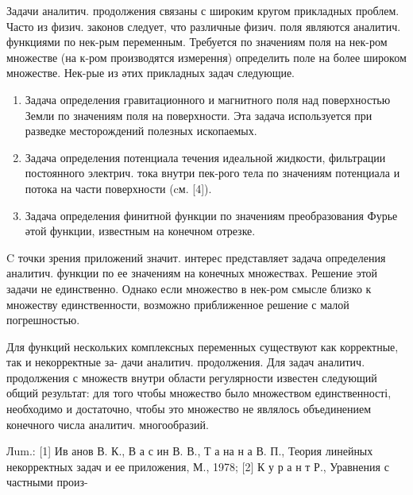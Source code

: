\documentclass[10pt]{article}
\begin{document}
Задачи аналитич. продолжения связаны с широким кругом прикладных проблем. Часто из физич. законов следует, что различные физич. поля являются аналитич. функциями по нек-рым переменным. Требуется по значениям поля на нек-ром множестве (на к-ром производятся измерення) определить поле на более широком множестве. Нек-рые из әтих прикладных задач следующие.



\begin{enumerate}

  \item Задача определения гравитационного и магнитного поля над поверхностью Земли по значениям поля на поверхности. Эта задача используется при разведке месторождений полезных ископаемых.



  \item Задача определения потенциала течения идеальной жидкости, фильтрации постоянного электрич. тока внутри пек-рого тела по значениям потенциала и потока на части поверхности (cм. [4]).



  \item Задача определения финитной функции по значениям преобразования Фурье әтой функции, известным на конечном отрезке.



\end{enumerate}



C точки зрения приложений значит. интерес представляет задача определения аналитич. функции по ее значениям на конечных множествах. Решение этой задачи не единственно. Однако если множество в нек-ром смысле близко к множеству единственности, возможно приближенное решение с малой погрешностью.



Для функций нескольких комплексных переменных существуют как корректные, так и некорректные за- дачи аналитич. продолжения. Для задач аналитич. продолжения с множеств внутри области регулярности известен следующий общий результат: для того чтобы множество было множеством единственності, необходимо и достаточно, чтобы это множество не являлось объединением конечного числа аналитич. многообразий.



Лum.: [1] Ив анов В. К., В а с ин В. В., Т а на н а В. П., Теория линейных некорректных задач и ее приложения, М., 1978; [2] К у р а н т Р., Уравнения с частными произ-
\end{document}
